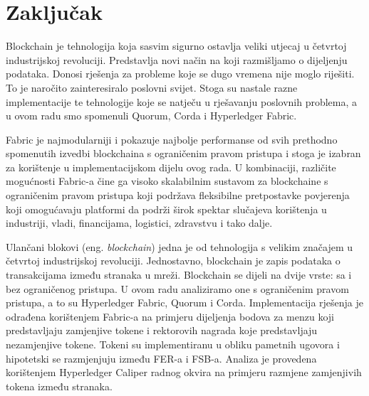 \documentclass[times, utf8, diplomski]{fer}
\begin{document}
\chapter{Zaključak}
Blockchain je tehnologija koja sasvim sigurno ostavlja veliki utjecaj u četvrtoj industrijskoj revoluciji. Predstavlja novi način na koji razmišljamo o dijeljenju podataka. Donosi rješenja za probleme koje se dugo vremena nije moglo riješiti. To je naročito zainteresiralo poslovni svijet.  Stoga su nastale razne implementacije te tehnologije koje se natječu u rješavanju poslovnih problema, a u ovom radu smo spomenuli Quorum, Corda i Hyperledger Fabric.  

Fabric je najmodularniji i pokazuje najbolje performanse od svih prethodno spomenutih izvedbi blockchaina s ograničenim pravom pristupa i stoga je izabran za korištenje u implementacijskom dijelu ovog rada. U kombinaciji, različite mogućnosti Fabric-a čine ga visoko skalabilnim sustavom za blockchaine s ograničenim pravom pristupa koji podržava fleksibilne pretpostavke povjerenja koji omogućavaju platformi da podrži širok spektar slučajeva korištenja u industriji, vladi, financijama, logistici, zdravstvu i tako dalje.





\begin{sazetak}
Ulančani blokovi (eng. \textit{blockchain}) jedna je od tehnologija s velikim značajem u četvrtoj industrijskoj revoluciji. Jednostavno, blockchain je zapis podataka o transakcijama između stranaka u mreži.  Blockchain se dijeli na dvije vrste: sa i bez ograničenog pristupa. U ovom radu analiziramo one s ograničenim pravom pristupa, a to su Hyperledger Fabric, Quorum i Corda. Implementacija rješenja je odrađena korištenjem Fabric-a na primjeru dijeljenja bodova za menzu koji predstavljaju zamjenjive tokene i rektorovih nagrada koje predstavljaju nezamjenjive tokene. Tokeni su implementiranu u obliku pametnih ugovora i hipotetski se razmjenjuju između FER-a i FSB-a.  Analiza je provedena korištenjem Hyperledger Caliper radnog okvira na primjeru razmjene zamjenjivih tokena između stranaka. 

\end{sazetak}
\end{document}
